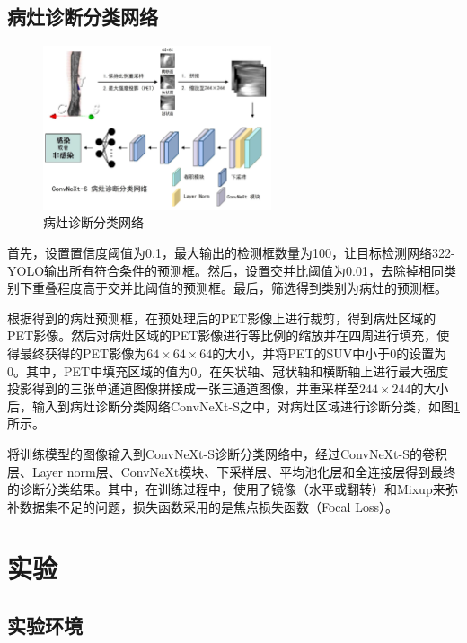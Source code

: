 \subsection{病灶诊断分类网络}

\begin{figure}[b]
  \centering
  \includegraphics[width=0.6\textwidth]{figures/chap04_classifier.jpg}
  \caption{病灶诊断分类网络}
  \label{fig:chap04_classifier}
\end{figure}

首先，设置置信度阈值为0.1，最大输出的检测框数量为100，让目标检测网络322-YOLO输出所有符合条件的预测框。然后，设置交并比阈值为0.01，去除掉相同类别下重叠程度高于交并比阈值的预测框。最后，筛选得到类别为病灶的预测框。

根据得到的病灶预测框，在预处理后的PET影像上进行裁剪，得到病灶区域的PET影像。然后对病灶区域的PET影像进行等比例的缩放并在四周进行填充，使得最终获得的PET影像为\(64\times64\times64\)的大小，并将PET的SUV中小于0的设置为0。其中，PET中填充区域的值为0。在矢状轴、冠状轴和横断轴上进行最大强度投影得到的三张单通道图像拼接成一张三通道图像，并重采样至\(244 \times 244\)的大小后，输入到病灶诊断分类网络ConvNeXt-S之中，对病灶区域进行诊断分类，如图\ref{fig:chap04_classifier}所示。

将训练模型的图像输入到ConvNeXt-S诊断分类网络中，经过ConvNeXt-S的卷积层、Layer norm层、ConvNeXt模块、下采样层、平均池化层和全连接层得到最终的诊断分类结果。其中，在训练过程中，使用了镜像（水平或翻转）和Mixup来弥补数据集不足的问题，损失函数采用的是焦点损失函数（Focal Loss）。

\section{实验}

\subsection{实验环境}

